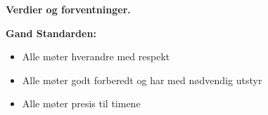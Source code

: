 \documentclass[12pt,a4paper]{article}
\begin{document}
\centerline{\bf Verdier og forventninger. } \bigskip 


\noindent
{\bf Gand Standarden:}    
\begin{itemize}
\item{} Alle møter hverandre med respekt
\item{} Alle møter godt forberedt og har med nødvendig utstyr
\item{} Alle møter presis til timene
\end{itemize}
\vskip 10pt


%
\end{document}

